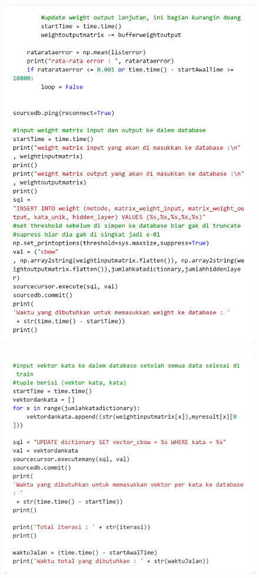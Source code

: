 \documentclass[12pt]{report}
\begin{document}
\begin{figure}[H]
\centering
\includegraphics[scale=0.3]{trainingcbow4}
\end{figure}
\begin{figure}[H]
\centering
\includegraphics[scale=0.3]{trainingcbow5}
\end{figure}
\end{document}
